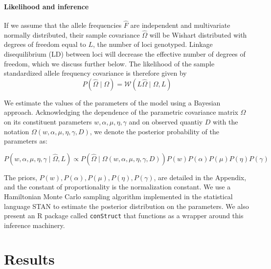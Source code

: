 \documentclass[12pt]{article}
\begin{document}
\paragraph{Likelihood and inference}
If we assume that the  allele frequencies $\widehat{F}$ are independent and multivariate normally distributed, 
their sample covariance $\widehat{\Omega}$ 
will be Wishart distributed with degrees of freedom equal to $L$, 
the number of loci genotyped.
Linkage disequilibrium (LD) between loci will decrease the effective number of degrees of freedom, 
which we discuss further below.
The likelihood of the sample standardized allele frequency covariance is therefore given by
\begin{equation}
P(\widehat{\Omega} \; | \; \Omega) = \mathcal{W} \left( L\widehat{\Omega} \; | \; \Omega,L\right)
\end{equation}

We estimate the values of the parameters of the model using a Bayesian approach.
Acknowledging the dependence of the parametric covariance matrix $\Omega$ on its constituent parameters
$w,\alpha,\mu,\eta,\gamma$ and on observed quantiy $D$ with the notation $\Omega(w,\alpha,\mu,\eta,\gamma,D)$,
we denote the posterior probability of the parameters as:

\begin{equation}
P\left( w,\alpha,\mu,\eta,\gamma \;	| \; \widehat{\Omega}, L \right) \propto
P\left(\widehat{\Omega} \; | \; \Omega(w,\alpha,\mu,\eta,\gamma,D) \right)
P(w)P(\alpha)P(\mu)P(\eta)P(\gamma)
\end{equation}

The priors, $P(w),P(\alpha),P(\mu),P(\eta),P(\gamma)$, are detailed in the Appendix,
and the constant of proportionality is the normalization constant.
We use a Hamiltonian Monte Carlo sampling algorithm implemented in the statistical language STAN
\citep{stan, NUTS, stan_lib, rstan} to estimate the posterior distribution on the parameters.
We also present an R package \citep{R} called \texttt{conStruct} that functions as a wrapper 
around this inference machinery.

\section*{Results}
\end{document}
